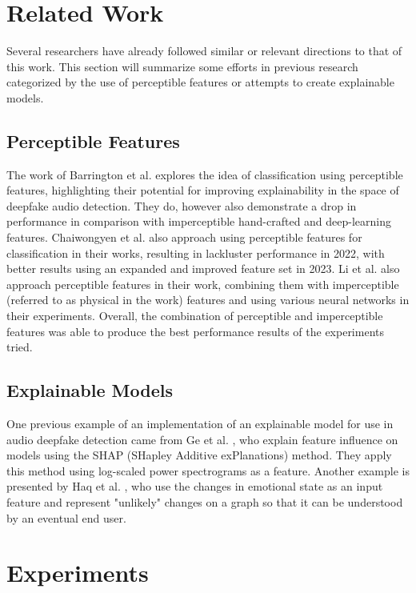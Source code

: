 \documentclass{article}
\begin{document}
	\section{Related Work}
	Several researchers have already followed similar or relevant directions to that of this work.
	This section will summarize some efforts in previous research categorized by the use of
	perceptible features or attempts to create explainable models.
	\subsection{Perceptible Features}
	The work of Barrington et al. \cite{barrington_single_2023} explores the idea of classification
	using perceptible features, highlighting their potential for improving explainability in the
	space of deepfake audio detection. They do, however also demonstrate a drop in performance in
	comparison with imperceptible hand-crafted and deep-learning features.
	\newline
	Chaiwongyen et al. \cite{chaiwongyen_contribution_2022,chaiwongyen_deepfake-speech_2023} also
	approach using perceptible features for classification in their works, resulting in lackluster
	performance in 2022, with better results using an expanded and improved feature set in 2023.
	\newline
	Li et al. \cite{li_comparative_2022} also approach perceptible features in their work,
	combining them with imperceptible (referred to as physical in the work) features and using
	various neural networks in their experiments. Overall, the combination of perceptible and
	imperceptible features was able to produce the best performance results of the experiments
	tried.
	\subsection{Explainable Models}
	One previous example of an implementation of an explainable model for use in audio deepfake
	detection came from Ge et al. \cite{ge_explaining_2024}, who explain feature influence on
	models using the SHAP (SHapley Additive exPlanations) method. They apply this method using
	log-scaled power spectrograms as a feature.
	\newline
	Another example is presented by Haq et al. \cite{haq_multimodal_2023}, who use the changes in
	emotional state as an input feature and represent "unlikely" changes on a graph so that it can
	be understood by an eventual end user.
	\section{Experiments}
\end{document}
